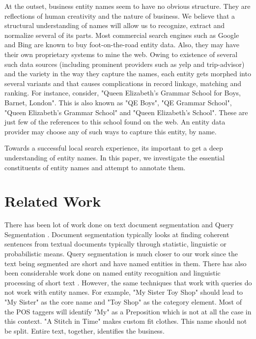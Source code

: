 \documentclass{acm_proc_article-sp}
\begin{document}
At the outset, business entity names seem to have no obvious structure. They are reflections of human creativity and the nature of business. We believe that a structural understanding of names will allow us to recognize, extract and normalize several of its parts. Most commercial search engines such as Google and Bing are known to buy foot-on-the-road entity data. Also, they may have their own proprietary systems to mine the web. Owing to existence of several such data sources (including prominent providers such as yelp and trip-advisor) and the variety in the way they capture the names, each entity gets morphed into several variants and that causes complications in record linkage, matching and ranking. For instance, consider, "Queen Elizabeth's Grammar School for Boys, Barnet, London". This is also known as "QE Boys", "QE Grammar School", "Queen Elizabeth's Grammar School" and "Queen Elizabeth's School". These are just few of the references to this school found on the web. An entity data provider may choose any of such ways to capture this entity, by name.

Towards a successful local search experience, its important to get a deep understanding of entity names. In this paper, we investigate the essential constituents of entity names and attempt to annotate them.


\section{Related Work}
There has been lot of work done on text document segmentation\cite{Beeferman:1999:SMT:309497.309507}\cite{Huang:2003:AML:945486.945492} and Query Segmentation \cite{Hagen:2011:QSR:1963405.1963423}\cite{Hagen:2010:PNQ:1835449.1835621}. Document segmentation typically looks at finding coherent sentences from textual documents typically through statistic, linguistic or probabilistic means. Query segmentation is much closer to our work since the text being segmented are short and have named entities in them. There has also been considerable work done on named entity recognition\cite{Guo:2009:NER:1571941.1571989}\cite{Li:2012:TNE:2348283.2348380} and linguistic processing of short text \cite{Murnane:2013:RLU:2487788.2488162}\cite{Taksa:2007:UWS:1262257.1262320}. However, the same techniques that work with queries do not work with entity names. For example, "My Sister Toy Shop" should lead to "My Sister" as the core name and "Toy Shop" as the category element. Most of the POS taggers will identify "My" as a Preposition which is not at all the case in this context. "A Stitch in Time" makes custom fit clothes. This name should not be split. Entire text, together, identifies the business.
\end{document}
